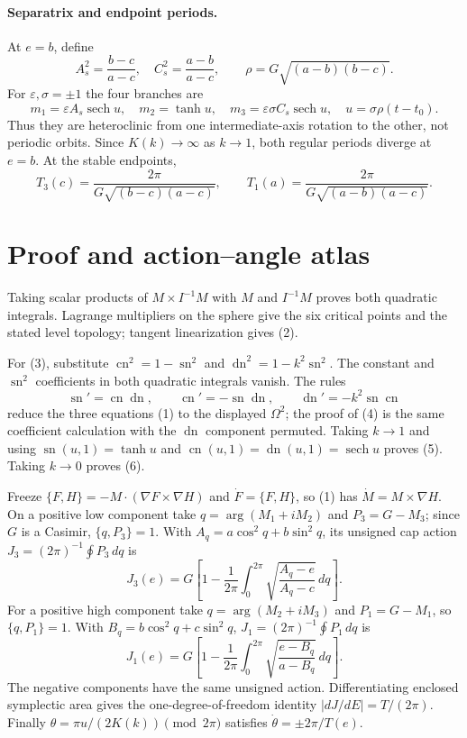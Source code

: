 \documentclass[8pt]{extarticle}
\newcommand{\sn}{\operatorname{sn}}
\newcommand{\cn}{\operatorname{cn}}
\newcommand{\dn}{\operatorname{dn}}
\newcommand{\sech}{\operatorname{sech}}
\begin{document}
\paragraph{Separatrix and endpoint periods.}
At $e=b$, define
\[
 A_s^2=\frac{b-c}{a-c},\quad C_s^2=\frac{a-b}{a-c},
 \qquad \rho=G\sqrt{(a-b)(b-c)}.
\]
For $\varepsilon,\sigma=\pm1$ the four branches are
\begin{equation}
 m_1=\varepsilon A_s\sech u,\quad m_2=\tanh u,\quad
 m_3=\varepsilon\sigma C_s\sech u,\quad
 u=\sigma\rho(t-t_0).                                \tag{5}
\end{equation}
Thus they are heteroclinic from one intermediate-axis rotation to the
other, not periodic orbits.  Since $K(k)\to\infty$ as $k\to1$, both regular
periods diverge at $e=b$.  At the stable endpoints,
\begin{equation}
 T_3(c)=\frac{2\pi}{G\sqrt{(b-c)(a-c)}},\qquad
 T_1(a)=\frac{2\pi}{G\sqrt{(a-b)(a-c)}}.              \tag{6}
\end{equation}

\section{Proof and action--angle atlas}
Taking scalar products of $M\times I^{-1}M$ with $M$ and $I^{-1}M$
proves both quadratic integrals.  Lagrange multipliers on the sphere give
the six critical points and the stated level topology; tangent
linearization gives (2).

For (3), substitute $\cn^2=1-\sn^2$ and
$\dn^2=1-k^2\sn^2$.  The constant and $\sn^2$ coefficients in both
quadratic integrals vanish.  The rules
\[
 \sn'=\cn\dn,\qquad \cn'=-\sn\dn,\qquad
 \dn'=-k^2\sn\cn
\]
reduce the three equations (1) to the displayed $\Omega^2$; the proof of
(4) is the same coefficient calculation with the $\dn$ component
permuted.  Taking $k\to1$ and using $\sn(u,1)=\tanh u$ and
$\cn(u,1)=\dn(u,1)=\sech u$ proves (5).  Taking $k\to0$ proves (6).

Freeze $\{F,H\}=-M\cdot(\nabla F\times\nabla H)$ and
$\dot F=\{F,H\}$, so (1) has $\dot M=M\times\nabla H$.  On a positive
low component take $q=\arg(M_1+iM_2)$ and $P_3=G-M_3$; since $G$ is a
Casimir, $\{q,P_3\}=1$.  With $A_q=a\cos^2q+b\sin^2q$, its unsigned cap
action $J_3=(2\pi)^{-1}\oint P_3\,dq$ is
\begin{equation}
 J_3(e)=G\left[1-\frac1{2\pi}\int_0^{2\pi}
 \sqrt{\frac{A_q-e}{A_q-c}}\,dq\right].              \tag{7}
\end{equation}
For a positive high component take $q=\arg(M_2+iM_3)$ and
$P_1=G-M_1$, so $\{q,P_1\}=1$.  With
$B_q=b\cos^2q+c\sin^2q$, $J_1=(2\pi)^{-1}\oint P_1\,dq$ is
\begin{equation}
 J_1(e)=G\left[1-\frac1{2\pi}\int_0^{2\pi}
 \sqrt{\frac{e-B_q}{a-B_q}}\,dq\right].              \tag{8}
\end{equation}
The negative components have the same unsigned action.  Differentiating
enclosed symplectic area gives the one-degree-of-freedom identity
$|dJ/dE|=T/(2\pi)$.  Finally
$\theta=\pi u/(2K(k))\pmod{2\pi}$ satisfies
$\dot\theta=\pm2\pi/T(e)$.
\end{document}

